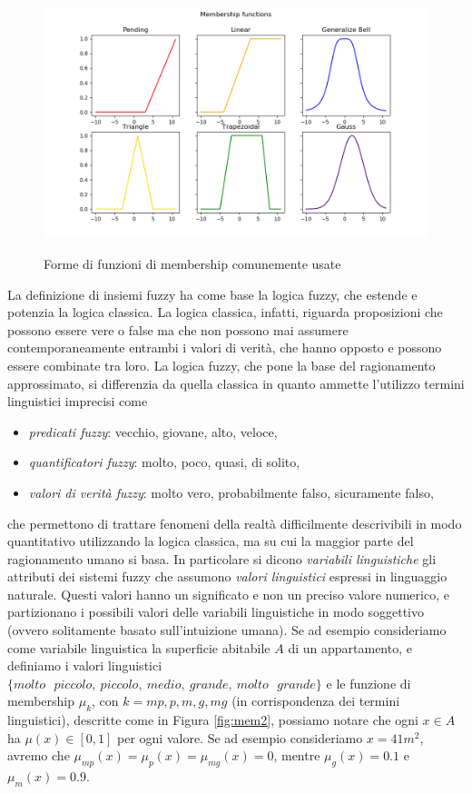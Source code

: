 \documentclass[oneside, openany]{book}
\begin{document}
		\begin{figure}[h]
			\centering
			{\includegraphics[width=.90\textwidth]{membership.png}} \quad
			\caption{Forme di funzioni di membership comunemente usate}
			\label{fig:membership}
			
		\end{figure}
	
		La definizione di insiemi fuzzy ha come base la logica fuzzy, che estende e potenzia la logica classica. La logica classica, infatti, riguarda proposizioni che possono essere vere o false ma che non possono mai assumere contemporaneamente entrambi i valori di verità, che hanno opposto e possono essere combinate tra loro.
		La logica fuzzy, che pone la base del ragionamento approssimato, si differenzia da quella classica in quanto ammette l'utilizzo termini linguistici imprecisi come
		\begin{itemize}
			\item{\textit{predicati fuzzy}}: vecchio, giovane, alto, veloce,
			\item{\textit{quantificatori fuzzy}}: molto, poco, quasi, di solito,
			\item{\textit{valori di verità fuzzy}}: molto vero, probabilmente falso, sicuramente falso,
		\end{itemize}	
		che permettono di trattare fenomeni della realtà difficilmente descrivibili in modo quantitativo utilizzando la logica classica, ma su cui la maggior parte del ragionamento umano si basa.
		In particolare si dicono \textit{variabili linguistiche} gli attributi dei sistemi fuzzy che assumono \textit{valori linguistici} espressi in linguaggio naturale. Questi valori hanno un significato e non un preciso valore numerico, e partizionano i possibili valori delle variabili linguistiche in modo soggettivo (ovvero solitamente basato sull'intuizione umana).
		Se ad esempio consideriamo come variabile linguistica la superficie abitabile $A$ di un appartamento, e definiamo i valori linguistici $\{molto\text{ }piccolo,\:piccolo,\:medio,\:grande,\:molto\text{ }grande\}$ e le funzione di membership $\mu_{k}$, con $k={mp, p, m, g, mg}$ (in corrispondenza dei termini linguistici), descritte come in Figura \ref{fig:mem2}, possiamo notare che ogni $x \in A$ ha $\mu(x) \in [0,1]$ per ogni valore. Se ad esempio consideriamo $x=41m^2$, avremo che $\mu_{mp}(x)=\mu_p(x)=\mu_{mg}(x)=0$, mentre $\mu_g(x)=0.1$ e $\mu_m(x)=0.9$.
		
\end{document}
